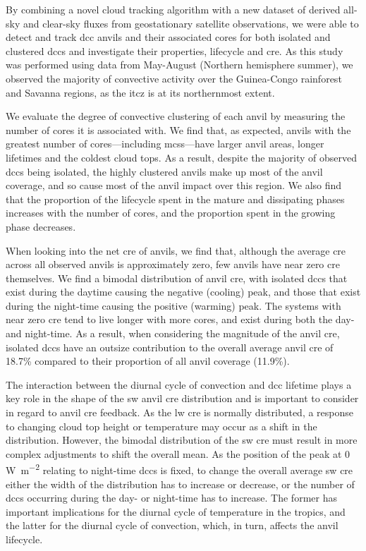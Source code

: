 By combining a novel cloud tracking algorithm with a new dataset of derived all-sky and clear-sky fluxes from geostationary satellite observations, we were able to detect and track \acrshort{dcc} anvils and their associated cores for both isolated and clustered \acrshort{dcc}s and investigate their properties, lifecycle and \acrshort{cre}. 
As this study was performed using data from May-August (Northern hemisphere summer), we observed the majority of convective activity over the Guinea-Congo rainforest and Savanna regions, as the \acrshort{itcz} is at its northernmost extent.

We evaluate the degree of convective clustering of each anvil by measuring the number of cores it is associated with. 
We find that, as expected, anvils with the greatest number of cores---including \acrshort{mcs}s---have larger anvil areas, longer lifetimes and the coldest cloud tops. 
As a result, despite the majority of observed \acrshort{dcc}s being isolated, the highly clustered anvils make up most of the anvil coverage, and so cause most of the anvil impact over this region. 
We also find that the proportion of the lifecycle spent in the mature and dissipating phases increases with the number of cores, and the proportion spent in the growing phase decreases.

When looking into the net \acrshort{cre} of anvils, we find that, although the average \acrshort{cre} across all observed anvils is approximately zero, few anvils have near zero \acrshort{cre} themselves. 
We find a bimodal distribution of anvil \acrshort{cre}, with isolated \acrshort{dcc}s that exist during the daytime causing the negative (cooling) peak, and those that exist during the night-time causing the positive (warming) peak. 
The systems with near zero \acrshort{cre} tend to live longer with more cores, and exist during both the day- and night-time. 
As a result, when considering the magnitude of the anvil \acrshort{cre}, isolated \acrshort{dcc}s have an outsize contribution to the overall average anvil \acrshort{cre} of 18.7\% compared to their proportion of all anvil coverage (11.9\%).

The interaction between the diurnal cycle of convection and \acrshort{dcc} lifetime plays a key role in the shape of the \acrshort{sw} anvil \acrshort{cre} distribution and is important to consider in regard to anvil \acrshort{cre} feedback. 
As the \acrshort{lw} \acrshort{cre} is normally distributed, a response to changing cloud top height or temperature may occur as a shift in the distribution. 
However, the bimodal distribution of the \acrshort{sw} \acrshort{cre} must result in more complex adjustments to shift the overall mean. 
As the position of the peak at 0 \,\unit{W m^{-2}} relating to night-time \acrshort{dcc}s is fixed, to change the overall average \acrshort{sw} \acrshort{cre} either the width of the distribution has to increase or decrease, or the number of \acrshort{dcc}s occurring during the day- or night-time has to increase. 
The former has important implications for the diurnal cycle of temperature in the tropics, and the latter for the diurnal cycle of convection, which, in turn, affects the anvil lifecycle.

